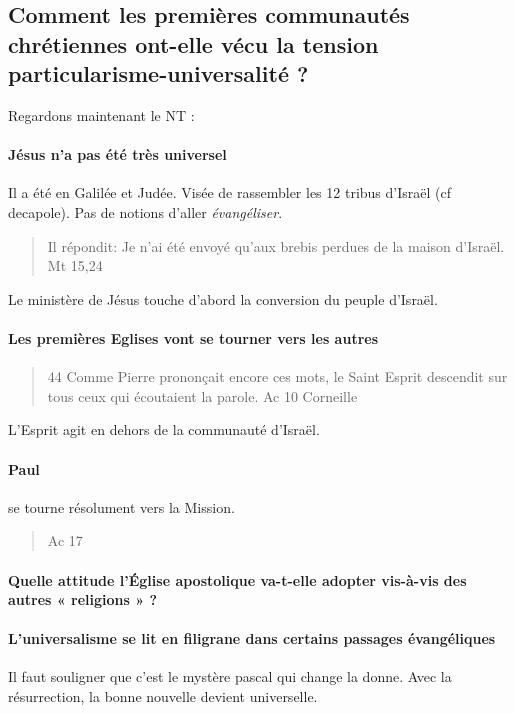     \subsection{Comment les premières communautés chrétiennes ont-elle vécu la
    tension particularisme-universalité ?}
    
    Regardons maintenant le NT : 
    \paragraph{Jésus n'a pas été très universel} Il a été en Galilée et Judée. Visée de rassembler les 12 tribus d'Israël (cf decapole). Pas de notions d'aller \textit{évangéliser}.
    \begin{quote}
         Il répondit: Je n'ai été envoyé qu'aux brebis perdues de la maison d'Israël.   Mt 15,24 
    \end{quote}
  Le ministère de Jésus touche d'abord la conversion du peuple d'Israël. 
  
  \paragraph{Les premières Eglises vont se tourner vers les autres}
  \begin{quote}
      44 Comme Pierre prononçait encore ces mots, le Saint Esprit descendit sur tous ceux qui écoutaient la parole.
      Ac 10 Corneille
  \end{quote}
    L'Esprit agit en dehors de la communauté d'Israël.
    
\paragraph{Paul} se tourne résolument vers la Mission. 
\begin{quote}
    Ac 17
\end{quote}



     
      
\paragraph{Quelle attitude l'Église apostolique va-t-elle adopter vis-à-vis
      des autres
« religions » ?}


\paragraph{L'universalisme se lit en filigrane dans certains passages
  évangéliques}
  Il faut souligner que c'est le mystère pascal qui change la donne. Avec la résurrection, la bonne nouvelle devient universelle.
